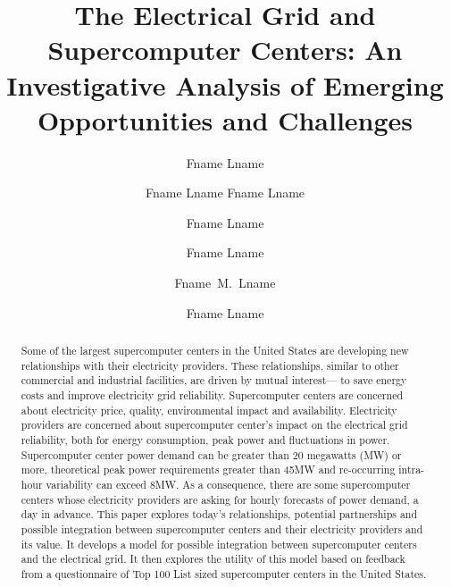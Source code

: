 \documentclass[runningheads]{llncs}
\begin{document}
%
\frontmatter          %
%
\pagestyle{headings}  %
%
%
\mainmatter              %
%
\title{
The Electrical Grid and Supercomputer Centers:  
An Investigative Analysis of Emerging Opportunities and Challenges
}

%
%
%
\author{Fname Lname \and Fname Lname
Fname Lname \and Fname Lname \and Fname Lname \and Fname~M.~Lname \and
Fname Lname}
%
%
%

\maketitle              %

\begin{abstract}
Some of the largest supercomputer centers in the United 
States are developing new relationships with their 
electricity providers.  These relationships, similar to other commercial 
and industrial facilities, are driven by mutual interest— to save energy 
costs and improve electricity grid reliability.  Supercomputer centers are concerned about 
electricity price, quality, environmental impact and 
availability. Electricity providers are concerned about 
supercomputer center's impact on the electrical grid reliability, both 
for energy consumption, peak power and fluctuations in 
power. Supercomputer center power demand can be greater 
than 20 megawatts (MW) or more, theoretical peak power requirements 
greater than 45MW and re-occurring intra-hour variability 
can exceed 8MW. As a consequence, there are some 
supercomputer centers whose electricity providers are 
asking for hourly forecasts of power demand, a day in 
advance.   This paper explores today's relationships, 
potential partnerships and possible integration between 
supercomputer centers and their electricity providers and its value. It 
develops a model for possible integration between 
supercomputer centers and the electrical grid. It then 
explores the utility of this model based on feedback from a 
questionnaire of Top 100 List sized supercomputer centers 
in the United States.
\end{abstract}
\end{document}
